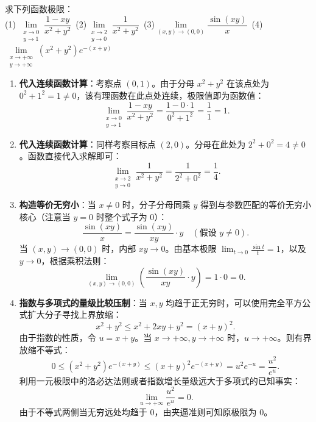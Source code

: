 \documentclass[lang=cn,11pt]{elegantbook}
\begin{document}
\begin{exercise}[多元函数极限计算]
求下列函数极限：\\
(1) $\lim\limits_{\substack{x\to 0 \\ y\to 1}} \dfrac{1-xy}{x^2+y^2}$~(2)$\lim\limits_{\substack{x\to 2 \\ y\to 0}} \dfrac{1}{x^2+y^2}$~(3)$\lim\limits_{(x,y)\to(0,0)} \dfrac{\sin(xy)}{x}$~(4)$\lim\limits_{\substack{x\to +\infty \\ y\to +\infty}} (x^2+y^2)e^{-(x+y)}$
\end{exercise}
\begin{solution}
\begin{enumerate}
  \item[(1)] \textbf{代入连续函数计算}：考察点 $(0,1)$。由于分母 $x^2+y^2$ 在该点处为 $0^2+1^2 = 1 \neq 0$，该有理函数在此点处连续，极限值即为函数值：
  \[
  \lim_{\substack{x\to 0 \\ y\to 1}} \frac{1-xy}{x^2+y^2} = \frac{1 - 0 \cdot 1}{0^2 + 1^2} = \frac{1}{1} = 1.
  \]

  \item[(2)] \textbf{代入连续函数计算}：同样考察目标点 $(2,0)$。分母在此处为 $2^2+0^2=4 \neq 0$。函数直接代入求解即可：
  \[
  \lim_{\substack{x\to 2 \\ y\to 0}} \frac{1}{x^2+y^2} = \frac{1}{2^2+0^2} = \frac{1}{4}.
  \]

  \item[(3)] \textbf{构造等价无穷小}：当 $x \neq 0$ 时，分子分母同乘 $y$ 得到与参数匹配的等价无穷小核心（注意当 $y=0$ 时整个式子为 $0$）：
  \[
  \frac{\sin(xy)}{x} = \frac{\sin(xy)}{xy} \cdot y \quad (\text{假设 } y \neq 0).
  \]
  当 $(x,y) \to (0,0)$ 时，内部 $xy \to 0$。由基本极限 $\lim_{t\to 0}\frac{\sin t}{t} = 1$，以及 $y \to 0$，根据乘积法则：
  \[
  \lim_{(x,y)\to(0,0)} \left( \frac{\sin(xy)}{xy} \cdot y \right) = 1 \cdot 0 = 0.
  \]

  \item[(4)] \textbf{指数与多项式的量级比较压制}：当 $x,y$ 均趋于正无穷时，可以使用完全平方公式扩大分子寻找上界放缩：
  \[
  x^2+y^2 \leqslant  x^2+2xy+y^2 = (x+y)^2.
  \]
  由于指数的性质，令 $u = x+y$。当 $x\to +\infty, y\to +\infty$ 时，$u\to +\infty$。则有界放缩不等式：
  \[
  0 \leqslant  (x^2+y^2)e^{-(x+y)} \leqslant  (x+y)^2 e^{-(x+y)} = u^2 e^{-u} = \frac{u^2}{e^u}.
  \]
  利用一元极限中的洛必达法则或者指数增长量级远大于多项式的已知事实：
  \[
  \lim_{u\to+\infty} \frac{u^2}{e^u} = 0.
  \]
  由于不等式两侧当无穷远处均趋于 $0$，由夹逼准则可知原极限为 $0$。
\end{enumerate}
\end{solution}
\end{document}
